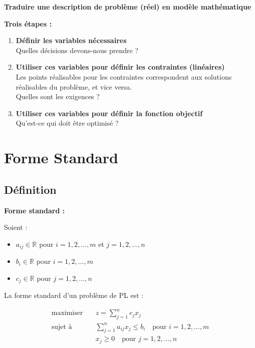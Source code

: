 \documentclass[12pt,a4paper]{article}
\begin{document}
\begin{methode}
\textbf{Traduire une description de problème (réel) en modèle mathématique}

\textbf{Trois étapes :}
\begin{enumerate}
    \item \textcolor{titrebleu}{\textbf{Définir les variables nécessaires}}\\
    Quelles décisions devons-nous prendre ?
    
    \item \textcolor{defvert}{\textbf{Utiliser ces variables pour définir les contraintes (linéaires)}}\\
    Les points réalisables pour les contraintes correspondent aux solutions réalisables du problème, et vice versa.\\
    Quelles sont les exigences ?
    
    \item \textcolor{algoviolet}{\textbf{Utiliser ces variables pour définir la fonction objectif}}\\
    Qu'est-ce qui doit être optimisé ?
\end{enumerate}
\end{methode}

\newpage
\section{Forme Standard}

\subsection{Définition}

\begin{definition}
\textbf{Forme standard :}

Soient :
\begin{itemize}
    \item $a_{ij} \in \mathbb{R}$ pour $i = 1, 2, \ldots, m$ et $j = 1, 2, \ldots, n$
    \item $b_i \in \mathbb{R}$ pour $i = 1, 2, \ldots, m$
    \item $c_j \in \mathbb{R}$ pour $j = 1, 2, \ldots, n$
\end{itemize}

La forme standard d'un problème de PL est :

\begin{align*}
\text{maximiser} \quad & z = \sum_{j=1}^{n} c_jx_j\\
\text{sujet à} \quad & \sum_{j=1}^{n} a_{ij}x_j \leq b_i \quad \text{pour } i = 1, 2, \ldots, m\\
& x_j \geq 0 \quad \text{pour } j = 1, 2, \ldots, n
\end{align*}
\end{definition}
\end{document}
